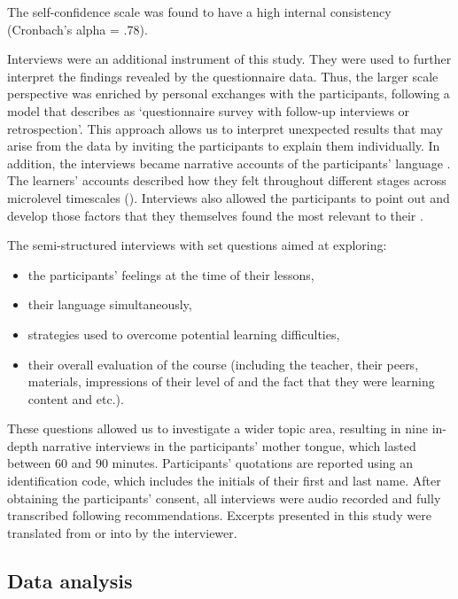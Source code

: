 \documentclass[output=paper]{langsci/langscibook}
\begin{document}
The  self-confidence scale was found to have a high internal consistency (Cronbach’s alpha = .78). 



Interviews were an additional instrument of this study. They were used to further interpret the findings revealed by the questionnaire data. Thus, the larger scale perspective was enriched by personal exchanges with the participants, following a model that \citet[170]{Dörnyei2007} describes as ‘questionnaire survey with follow-up interviews or retrospection’. This approach allows us to interpret unexpected results that may arise from the data by inviting the participants to explain them individually. In addition, the interviews became narrative accounts of the participants’ language . The learners’ accounts described how they felt throughout different stages across microlevel timescales (\citealt{MercerWilliams2014}). Interviews also allowed the participants to point out and develop those factors that they themselves found the most relevant to their . 



The semi-structured interviews with set questions aimed at exploring:


\begin{itemize}
\item the participants’ feelings at the time of their lessons,
\item their language simultaneously,
\item strategies used to overcome potential learning difficulties,
\item their overall evaluation of the course (including the teacher, their peers, materials, impressions of their level of  and the fact that they were learning content and etc.).
\end{itemize}

These questions allowed us to investigate a wider topic area, resulting in nine in-depth narrative interviews in the participants’ mother tongue, which lasted between 60 and 90 minutes. Participants’ quotations are reported using an identification code, which includes the initials of their first and last name. After obtaining the participants’ consent, all interviews were audio recorded and fully transcribed following \cite{Richards2003} recommendations. Excerpts presented in this study were translated from  or  into  by the interviewer.


\subsection{Data analysis}
\end{document}
